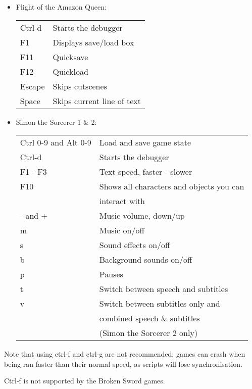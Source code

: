 \begin{itemize}
\begin{tabular}{ll}
  \end{tabular}
\item Flight of the Amazon Queen:
  \begin{tabular}{ll}
    Ctrl-d                 & Starts the debugger\\
    F1                     & Displays save/load box\\
    F11                    & Quicksave\\
    F12                    & Quickload\\
    Escape                 & Skips cutscenes\\
    Space                  & Skips current line of text\\
  \end{tabular}
\item Simon the Sorcerer 1 \& 2:\\
  \begin{tabular}{ll}
    Ctrl 0-9 and Alt 0-9   & Load and save game state\\
    Ctrl-d                 & Starts the debugger\\
    F1 - F3                & Text speed, faster - slower\\
    F10                    & Shows all characters and objects you can \\
                           & interact with\\
    - and +                & Music volume, down/up\\
    m                      & Music on/off\\
    s                      & Sound effects on/off\\
    b                      & Background sounds on/off\\
    p                      & Pauses\\
    t                      & Switch between speech and subtitles\\
    v                      & Switch between subtitles only and\\
                           & combined speech \& subtitles\\
                           & (Simon the Sorcerer 2 only)\\
  \end{tabular}
\end{itemize}
Note that using ctrl-f and ctrl-g are not recommended: games can crash when
being ran faster than their normal speed, as scripts will lose synchronisation.

Ctrl-f is not supported by the Broken Sword games.
